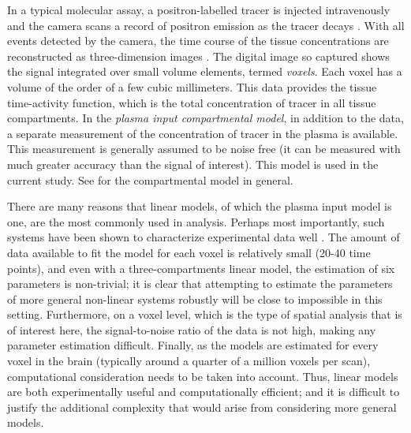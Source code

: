 In a typical molecular assay, a positron-labelled tracer is injected
intravenously and the \pet camera scans a record of positron emission as the
tracer decays \cite{Phelps2000}. With all events detected by the \pet camera,
the time course of the tissue concentrations are reconstructed as
three-dimension images \cite{Kinahan1989}. The digital image so captured
shows the signal integrated over small volume elements, termed \emph{voxels}.
Each voxel has a volume of the order of a few cubic millimeters. This data
provides the tissue time-activity function, which is the total concentration
of tracer in all tissue compartments. In the \emph{plasma input compartmental
model}, in addition to the \pet data, a separate measurement of the
concentration of tracer in the plasma is available. This measurement is
generally assumed to be noise free (it can be measured with much greater
accuracy than the signal of interest). This model is used in the current
study. See \cite{Gunn:2001cx} for the \pet compartmental model in general.

There are many reasons that linear \ode models, of which the plasma input
model is one, are the most commonly used in \pet analysis. Perhaps most
importantly, such systems have been shown to characterize \pet experimental
data well \cite{Lammertsma96}. The amount of data available to fit the model
for each voxel is relatively small (20-40 time points), and even with a
three-compartments linear \ode model, the estimation of six parameters is
non-trivial; it is clear that attempting to estimate the parameters of more
general non-linear \ode systems robustly will be close to impossible in this
setting. Furthermore, on a voxel level, which is the type of spatial analysis
that is of interest here, the signal-to-noise ratio of the data is not high,
making any parameter estimation difficult. Finally, as the models are
estimated for every voxel in the brain (typically around a quarter of a
million voxels per scan), computational consideration needs to be taken into
account. Thus, linear \ode models are both experimentally useful and
computationally efficient; and it is difficult to justify the additional
complexity that would arise from considering more general models.




